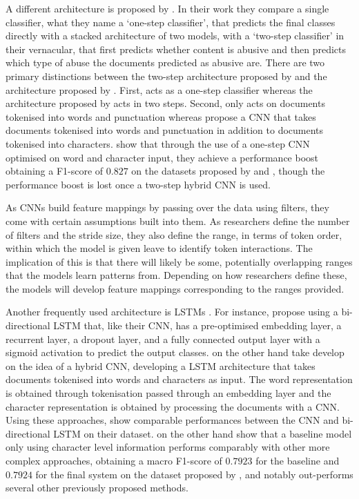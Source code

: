 A different architecture is proposed by \citet{Park:2017}.
In their work they compare a single classifier, what they name a `one-step classifier', that predicts the final classes directly with a stacked architecture of two models, with a `two-step classifier' in their vernacular, that first predicts whether content is abusive and then predicts which type of abuse the documents predicted as abusive are.
There are two primary distinctions between the two-step architecture proposed by \citet{Park:2017} and the architecture proposed by \citet{Kolhatkar:2020}.
First, \citet{Kolhatkar:2020} acts as a one-step classifier whereas the architecture proposed by \citet{Park:2017} acts in two steps.
Second, \citet{Kolhatkar:2020} only acts on documents tokenised into words and punctuation whereas \citet{Park:2017} propose a CNN that takes documents tokenised into words and punctuation in addition to documents tokenised into characters.
\citet{Park:2017} show that through the use of a one-step CNN optimised on word and character input, they achieve a performance boost obtaining a F1-score of $0.827$ on the datasets proposed by \citet{Waseem-Hovy:2016} and \citet{Waseem:2016}, though the performance boost is lost once a two-step hybrid CNN is used.

As CNNs build feature mappings by passing over the data using filters, they come with certain assumptions built into them.
As researchers define the number of filters and the stride size, they also define the range, in terms of token order, within which the model is given leave to identify token interactions.
The implication of this is that there will likely be some, potentially overlapping ranges that the models learn patterns from.
Depending on how researchers define these, the models will develop feature mappings corresponding to the ranges provided.

Another frequently used architecture is LSTMs \citep{Badjatiya:2017,Kolhatkar:2020,Meyer:2019}.
For instance, \citet{Kolhatkar:2020} propose using a bi-directional LSTM that, like their CNN, has a pre-optimised embedding layer, a recurrent layer, a dropout layer, and a fully connected output layer with a sigmoid activation to predict the output classes.
\citet{Meyer:2019} on the other hand take develop on the idea of a hybrid CNN, developing a LSTM architecture that takes documents tokenised into words and characters as input.
The word representation is obtained through tokenisation passed through an embedding layer and the character representation is obtained by processing the documents with a CNN.
Using these approaches, \citet{Kolhatkar:2020} show comparable performances between the CNN and bi-directional LSTM on their dataset.
\citet{Meyer:2019} on the other hand show that a baseline model only using character level information performs comparably with other more complex approaches, obtaining a macro F1-score of $0.7923$ for the baseline and $0.7924$ for the final system on the dataset proposed by \citet{Waseem-Hovy:2016}, and notably out-performs several other previously proposed methods.

